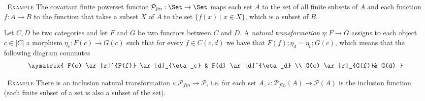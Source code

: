 \documentclass[10pt, a4paper]{isov2}
\renewenvironment{example}[0]{\ \newline \textsc{Example}\quad }{}
\begin{document}
\begin{example}
The covariant finite powerset functor $\mathcal{P}_{\mathit{fin}} : \Set \to \Set$
maps each set $A$ to the set of all finite subsets of $A$ and each function $f:A \to B$
to the function that takes a subset $X$ of $A$ to the set $\{f(x) \mid x\in X\}$,
which is a subset of $B$. 
\end{example}
 



\begin{definition}
Let $C, D$ be two categories and let $F$ and $G$ be two functors between $C$ and $D$.
A \emph{natural transformation} $\eta : F \to G$ assigns to each object $c\in |C|$ a
morphism $\eta_c : F(c) \to G(c) $ such that for every $f\in C(c,d)$ we have that 
$F(f);\eta_d = \eta_c;G(c)$, which means that the following diagram commutes
%
\begin{equation*}
\xymatrix{
  F(c) \ar[r]^{F(f)} \ar[d]_{\eta_c} & F(d) \ar[d]^{\eta_d} \\
  G(c) \ar[r]_{G(f)}& G(d) 
}
\end{equation*}
\end{definition}

\begin{example}
There is an inclusion natural transformation $\iota:\mathcal{P}_{\mathit{fin}}\to\mathcal{P}$,
i.e. for each set $A$, $\iota : \mathcal{P}_{\mathit{fin}}(A)\to\mathcal{P}(A)$ is the inclusion
function (each finite subset of a set is also a subset of the set).
\end{example}




\end{document}
